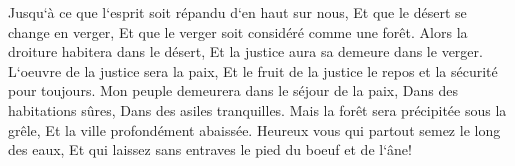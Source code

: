 \verse Jusqu`à ce que l`esprit soit répandu d`en haut sur nous, Et que le désert se change en verger, Et que le verger soit considéré comme une forêt. 
\verse Alors la droiture habitera dans le désert, Et la justice aura sa demeure dans le verger. 
\verse L`oeuvre de la justice sera la paix, Et le fruit de la justice le repos et la sécurité pour toujours. 
\verse Mon peuple demeurera dans le séjour de la paix, Dans des habitations sûres, Dans des asiles tranquilles. 
\verse Mais la forêt sera précipitée sous la grêle, Et la ville profondément abaissée. 
\verse Heureux vous qui partout semez le long des eaux, Et qui laissez sans entraves le pied du boeuf et de l`âne! 

